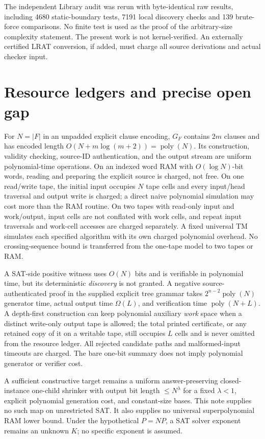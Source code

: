 \documentclass[11pt]{article}
\begin{document}
The independent Library audit was rerun with byte-identical raw results, including 4680 static-boundary tests, 7191 local discovery checks and 139 brute-force comparisons. No finite test is used as the proof of the arbitrary-size complexity statement. The present work is not kernel-verified. An externally certified LRAT conversion, if added, must charge all source derivations and actual checker input.

\section{Resource ledgers and precise open gap}
For $N=|F|$ in an unpadded explicit clause encoding, $G_F$ contains $2m$ clauses and has encoded length $O(N+ m\log(m+2))=\operatorname{poly}(N)$. Its construction, validity checking, source-ID authentication, and the output stream are uniform polynomial-time operations. On an indexed word RAM with $O(\log N)$-bit words, reading and preparing the explicit source is charged, not free. On one read/write tape, the initial input occupies $N$ tape cells and every input/head traversal and output write is charged; a direct naive polynomial simulation may cost more than the RAM routine. On two tapes with read-only input and work/output, input cells are not conflated with work cells, and repeat input traversals and work-cell accesses are charged separately. A fixed universal TM simulates each specified algorithm with its own charged polynomial overhead. No crossing-sequence bound is transferred from the one-tape model to two tapes or RAM.

A SAT-side positive witness uses $O(N)$ bits and is verifiable in polynomial time, but its deterministic \emph{discovery} is not granted. A negative source-authenticated proof in the supplied explicit tree grammar takes $2^{n-2}\operatorname{poly}(N)$ generator time, actual output time $\Omega(L)$, and verification time $\operatorname{poly}(N+L)$. A depth-first construction can keep polynomial auxiliary \emph{work} space when a distinct write-only output tape is allowed; the total printed certificate, or any retained copy of it on a writable tape, still occupies $L$ cells and is never omitted from the resource ledger. All rejected candidate paths and malformed-input timeouts are charged. The bare one-bit summary does not imply polynomial generator or verifier cost.

A sufficient constructive target remains a uniform answer-preserving closed-instance one-child shrinker with output bit length $\le N^\lambda$ for a fixed $\lambda<1$, explicit polynomial generation cost, and constant-size bases. This note supplies no such map on unrestricted SAT. It also supplies no universal superpolynomial RAM lower bound. Under the hypothetical $P=NP$, a SAT solver exponent remains an unknown $K$; no specific exponent is assumed.
\end{document}
